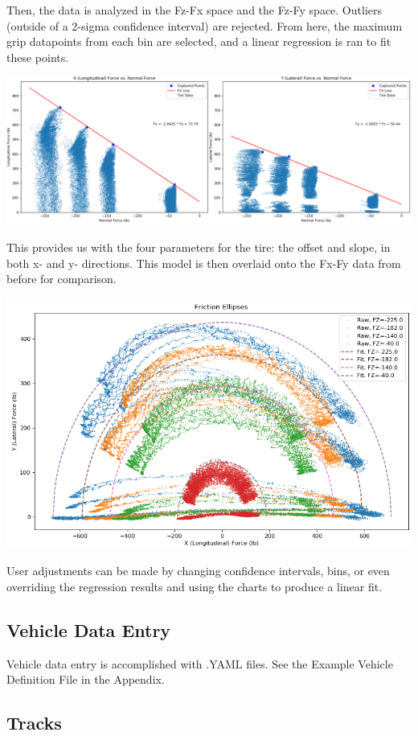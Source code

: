 \documentclass{article}
\begin{document}
Then, the data is analyzed in the Fz-Fx space and the Fz-Fy space. Outliers (outside of a 2-sigma confidence interval) are rejected. From here, the maximum grip datapoints from each bin are selected, and a linear regression is ran to fit these points.

\includegraphics[width=\textwidth]{fric_regression.png}

This provides us with the four parameters for the tire: the offset and slope, in both x- and y- directions. This model is then overlaid onto the Fx-Fy data from before for comparison.

\includegraphics[width=\textwidth]{fric_ellipses_fit.png}

User adjustments can be made by changing confidence intervals, bins, or even overriding the regression results and using the charts to produce a linear fit.

\subsection{Vehicle Data Entry}

Vehicle data entry is accomplished with .YAML files. See the Example Vehicle Definition File in the Appendix.

\subsection{Tracks}
\end{document}
